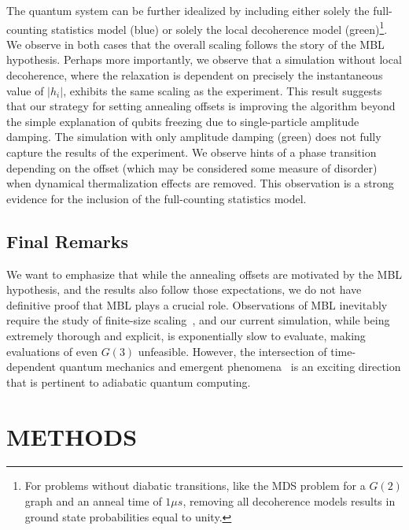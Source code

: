 \documentclass[prd,twocolumn,tightenlines,preprintnumbers,showpacs,superscriptaddress,notitlepage,nofootinbib,eqsecnum,floatfix,longbibliography,aps,10pt]{revtex4-1}
\begin{document}
The quantum system can be further idealized by including either solely the full-counting statistics model (blue) or solely the local decoherence model (green)\footnote{For problems without diabatic transitions, like the MDS problem for a $G(2)$ graph and an anneal time of $1\mu s$, removing all decoherence models results in ground state probabilities equal to unity.}. We observe in both cases that the overall scaling follows the story of the MBL hypothesis. Perhaps more importantly, we observe that a simulation without local decoherence, where the relaxation is dependent on precisely the instantaneous value of $|h_i|$, exhibits the same scaling as the experiment. This result suggests that our strategy for setting annealing offsets is improving the algorithm beyond the simple explanation of qubits freezing due to single-particle amplitude damping. The simulation with only amplitude damping (green) does not fully capture the results of the experiment. We observe hints of a phase transition depending on the offset (which may be considered some measure of disorder) when dynamical thermalization effects are removed. This observation is a strong evidence for the inclusion of the full-counting statistics model.

\subsection{Final Remarks}
\label{sec:results:final}
We want to emphasize that while the annealing offsets are motivated by the MBL hypothesis, and the results also follow those expectations, we do not have definitive proof that MBL plays a crucial role.
Observations of MBL inevitably require the study of finite-size scaling~\cite{2015PhRvB..91h1103L}, and our current simulation, while being extremely thorough and explicit, is exponentially slow to evaluate, making evaluations of even $G(3)$ unfeasible.
However, the intersection of time-dependent quantum mechanics and emergent phenomena~\cite{Goldenfeld:1992qy} is an exciting direction that is pertinent to adiabatic quantum computing.

\section{METHODS}
\label{sec:methods}
\end{document}
